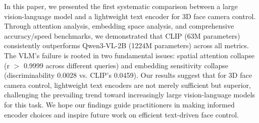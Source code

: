 In this paper, we presented the first systematic comparison between a large vision-language model and a lightweight text encoder for 3D face camera control. Through attention analysis, embedding space analysis, and comprehensive accuracy/speed benchmarks, we demonstrated that CLIP (63M parameters) consistently outperforms Qwen3-VL-2B (1224M parameters) across all metrics. The VLM's failure is rooted in two fundamental issues: spatial attention collapse (r $>$ 0.9999 across different queries) and embedding sensitivity collapse (discriminability 0.0028 vs. CLIP's 0.0459). Our results suggest that for 3D face camera control, lightweight text encoders are not merely sufficient but superior, challenging the prevailing trend toward increasingly large vision-language models for this task. We hope our findings guide practitioners in making informed encoder choices and inspire future work on efficient text-driven face control.

{\small


}


